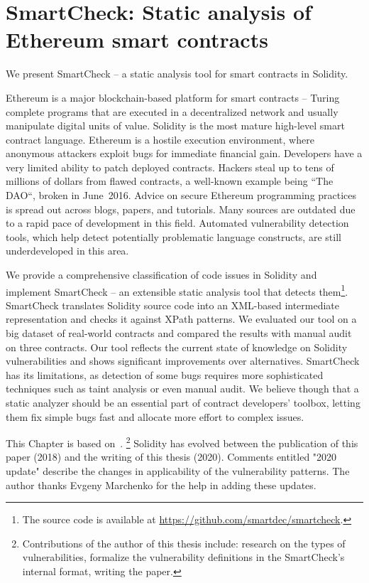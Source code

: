 \chapter{SmartCheck: Static analysis of Ethereum smart contracts}

\label{Chapter11SmartCheck}



We present SmartCheck -- a static analysis tool for smart contracts in Solidity.

Ethereum is a major blockchain-based platform for smart contracts -- Turing complete programs that are executed in a decentralized network and usually manipulate digital units of value.
Solidity is the most mature high-level smart contract language.
Ethereum is a hostile execution environment, where anonymous attackers exploit bugs for immediate financial gain.
Developers have a very limited ability to patch deployed contracts.
Hackers steal up to tens of millions of dollars from flawed contracts, a well-known example being ``The DAO``, broken in June~2016.
Advice on secure Ethereum programming practices is spread out across blogs, 
papers, and tutorials.
Many sources are outdated due to a rapid pace of development in this field.
Automated vulnerability detection tools, which help detect potentially problematic language constructs, are still underdeveloped in this area.

We provide a comprehensive classification of code issues in Solidity and implement SmartCheck -- an extensible static analysis tool that detects them\footnote{The source code is available at \url{https://github.com/smartdec/smartcheck}.}.
SmartCheck translates Solidity source code into an XML-based intermediate representation and checks it against XPath patterns.
We evaluated our tool on a big dataset of real-world contracts and compared the results with manual audit on three contracts.
Our tool reflects the current state of knowledge on Solidity vulnerabilities and shows significant improvements over alternatives.
SmartCheck has its limitations, as detection of some bugs requires more sophisticated techniques such as taint analysis or even manual audit.
We believe though that a static analyzer should be an essential part of contract developers' toolbox, letting them fix simple bugs fast and allocate more effort to complex issues.

This Chapter is based on~\cite{Tikhomirov2018}.
\footnote{Contributions of the author of this thesis include: research on the types of vulnerabilities, formalize the vulnerability definitions in the SmartCheck's internal format, writing the paper.}
Solidity has evolved between the publication of this paper (2018) and the writing of this thesis (2020).
Comments entitled "2020 update" describe the changes in applicability of the vulnerability patterns.
The author thanks Evgeny Marchenko for the help in adding these updates.



